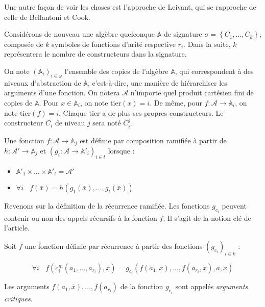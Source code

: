 \documentclass{report}
\newcommand{\bbA}{\mathbb{A}}
\begin{document}
			Une autre façon de voir les choses est l'approche de Leivant, qui se rapproche de celle de Bellantoni et Cook.
			
			Considérons de nouveau une algèbre quelconque $\bbA$ de signature $\sigma = \left\lbrace C_1, \dots, C_k \right\rbrace$, composée de $k$ symboles de fonctions d'arité respective $r_i$. Dans la suite, $k$ représentera le nombre de constructeurs dans la signature.
			
			\espace
				
			On note $(\bbA_i)_{i\in \omega}$ l'ensemble des copies de l'algèbre $\bbA$, qui correspondent à des niveaux d'abstraction de $\bbA$, c'est-à-dire, une manière de hiérarchiser les arguments d'une fonction. On notera $\mathcal{A}$ n'importe quel produit cartésien fini de copies de $\bbA$. Pour $x\in \bbA_i$, on note $\text{tier}(x) = i$. De même, pour $f : \mathcal{A} \to \bbA_i$, on note $\text{tier}(f) = i$. Chaque tier a de plus ses propres constructeurs. Le constructeur $C_i$ de niveau $j$ sera noté $C^j_i$. 
			
			
			\begin{definition}
				Une fonction $f: \mathcal{A} \to \bbA_j$ est définie par composition ramifiée à partir de $h: \mathcal{A}' \to \bbA_j$ et $\left(g_i : \mathcal{A} \to \bbA'_i\right)_{i\in t}$ lorsque :
				
				\begin{itemize}
					\item	$\bbA'_1 \times \dots \times \bbA'_t = \mathcal{A}'$
					
					\item 	$\forall i \:\:\:\:
					f\left( \bar{x} \right) = h\left( g_1\left( \bar{x}\right), \dots,  g_t\left( \bar{x} \right) \right)
					$
				\end{itemize}
			\end{definition}
			

			Revenons sur la définition de la récurrence ramifiée. Les fonctions $g_{c_i}$ peuvent contenir ou non des appels récursifs à la fonction $f$. Il s'agit de la notion clé de l'article.
			
			\begin{definition}
				Soit $f$ une fonction définie par récurrence à partir des fonctions $\left( g_{c_i} \right)_{i\in k}$ : 
				
				\[
					\forall i \:\:\:\: f(c_i^m(a_1, \dots, a_{r_i}), \bar{x})  = g_{c_i}\left( f(a_1, \bar{x}), \dots, f(a_{r_i}, \bar{x}), \bar{a}, \bar{x} \right)
				\]
				
				Les arguments $f(a_1, \bar{x}), \dots, f(a_{r_i})$ de la fonction $g_{c_i}$ sont appelés \emph{arguments critiques}.
			\end{definition}
			
\end{document}
